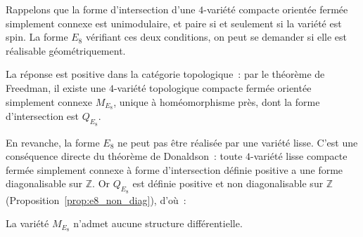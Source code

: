 Rappelons que la forme d'intersection d'une $4$-variété compacte orientée fermée simplement
connexe est unimodulaire, et paire si et seulement si la variété est spin. La forme $E_8$
vérifiant ces deux conditions, on peut se demander si elle est réalisable géométriquement.

\medskip

La réponse est positive dans la catégorie topologique~: par le théorème de Freedman, il existe
une $4$-variété topologique compacte fermée orientée simplement connexe $M_{E_8}$, unique à
homéomorphisme près, dont la forme d'intersection est $Q_{E_8}$.

\medskip

En revanche, la forme $E_8$ ne peut pas être réalisée par une variété lisse. C'est une
conséquence directe du théorème de Donaldson~: toute $4$-variété lisse compacte fermée
simplement connexe à forme d'intersection définie positive a une forme diagonalisable sur
$\mathbb{Z}$. Or $Q_{E_8}$ est définie positive et non diagonalisable sur $\mathbb{Z}$
(Proposition~\ref{prop:e8_non_diag}), d'où~:

\begin{corollary}\label{cor:e8_non_lissable}
  La variété $M_{E_8}$ n'admet aucune structure différentielle.
\end{corollary}
